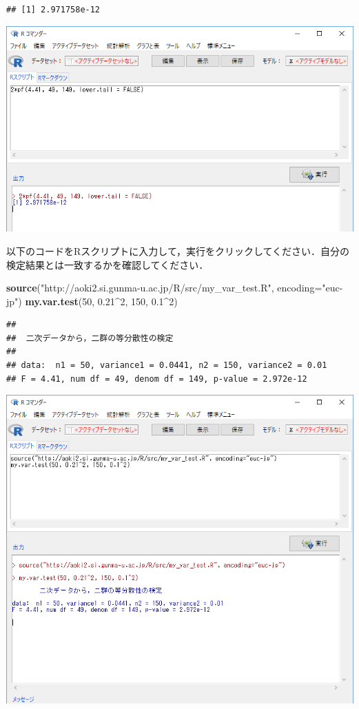 \documentclass[11pt,]{problemset}
\newenvironment{Shaded}{\begin{snugshade}}{\end{snugshade}}
\newcommand{\DataTypeTok}[1]{\textcolor[rgb]{0.13,0.29,0.53}{#1}}
\newcommand{\DecValTok}[1]{\textcolor[rgb]{0.00,0.00,0.81}{#1}}
\newcommand{\FloatTok}[1]{\textcolor[rgb]{0.00,0.00,0.81}{#1}}
\newcommand{\KeywordTok}[1]{\textcolor[rgb]{0.13,0.29,0.53}{\textbf{#1}}}
\newcommand{\NormalTok}[1]{#1}
\newcommand{\OperatorTok}[1]{\textcolor[rgb]{0.81,0.36,0.00}{\textbf{#1}}}
\newcommand{\StringTok}[1]{\textcolor[rgb]{0.31,0.60,0.02}{#1}}
\begin{document}
\begin{verbatim}
## [1] 2.971758e-12
\end{verbatim}

\begin{center}\includegraphics[width=0.9\linewidth]{pic/ftest} \end{center}
\bigskip

以下のコードをRスクリプトに入力して，実行をクリックしてください．自分の検定結果とは一致するかを確認してください．

\begin{Shaded}
\begin{Highlighting}[]
\KeywordTok{source}\NormalTok{(}\StringTok{"http://aoki2.si.gunma-u.ac.jp/R/src/my_var_test.R"}\NormalTok{, }\DataTypeTok{encoding=}\StringTok{"euc-jp"}\NormalTok{)}
\KeywordTok{my.var.test}\NormalTok{(}\DecValTok{50}\NormalTok{, }\FloatTok{0.21}\OperatorTok{^}\DecValTok{2}\NormalTok{, }\DecValTok{150}\NormalTok{, }\FloatTok{0.1}\OperatorTok{^}\DecValTok{2}\NormalTok{)}
\end{Highlighting}
\end{Shaded}

\begin{verbatim}
## 
##  二次データから，二群の等分散性の検定
## 
## data:  n1 = 50, variance1 = 0.0441, n2 = 150, variance2 = 0.01
## F = 4.41, num df = 49, denom df = 149, p-value = 2.972e-12
\end{verbatim}

\begin{center}\includegraphics[width=0.9\linewidth]{pic/ftest01} \end{center}
\bigskip
\end{document}
